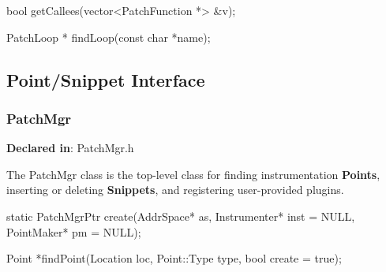 \begin{apient}
bool getCallees(vector<PatchFunction *> &v);
\end{apient}
    
    
\begin{apient}
PatchLoop * findLoop(const char *name);
\end{apient}
 

\subsection{Point/Snippet Interface}
\label{sec-3.1}

\subsubsection{PatchMgr}
\label{sec-3.1.1}

\textbf{Declared in}: PatchMgr.h

The PatchMgr class is the top-level class for finding instrumentation \textbf{Points},
inserting or deleting \textbf{Snippets}, and registering user-provided plugins.


\begin{apient}
static PatchMgrPtr create(AddrSpace* as, Instrumenter* inst = NULL,
                          PointMaker* pm = NULL);
\end{apient}



\begin{apient}
Point *findPoint(Location loc, Point::Type type, bool create = true);
\end{apient}

